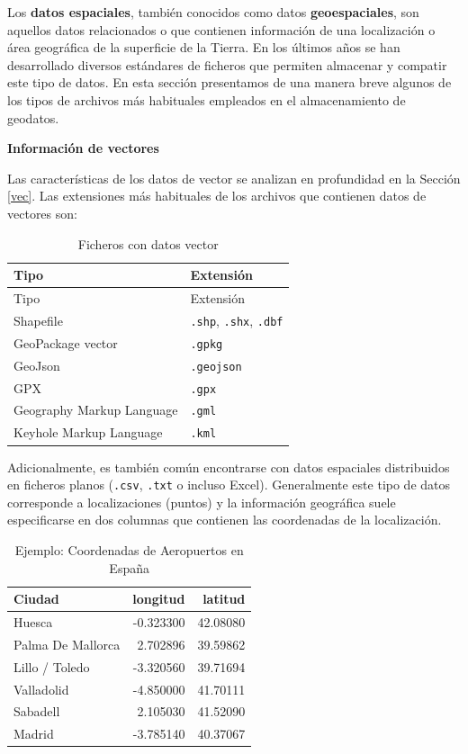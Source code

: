 \documentclass[
]{report}
\theoremstyle{definition}
\theoremstyle{definition}
\theoremstyle{definition}
\theoremstyle{definition}
\theoremstyle{remark}
\begin{document}
Los \textbf{datos espaciales}, también conocidos como datos \textbf{geoespaciales}, son
aquellos datos relacionados o que contienen información de una localización o
área geográfica de la superficie de la Tierra. En los últimos años se han
desarrollado diversos estándares de ficheros que permiten almacenar y compatir
este tipo de datos. En esta sección presentamos de una manera breve algunos de
los tipos de archivos más habituales empleados en el almacenamiento de geodatos.

\textbf{Información de vectores}

Las características de los datos de vector se analizan en profundidad en la
Sección \ref{vec}. Las extensiones más habituales de los archivos que contienen
datos de vectores son:

\begin{longtable}[]{@{}ll@{}}
\caption{Ficheros con datos vector}\tabularnewline
\toprule
Tipo & Extensión \\
\midrule
\endfirsthead
\toprule
Tipo & Extensión \\
\midrule
\endhead
Shapefile & \texttt{.shp}, \texttt{.shx}, \texttt{.dbf} \\
GeoPackage vector & \texttt{.gpkg} \\
GeoJson & \texttt{.geojson} \\
GPX & \texttt{.gpx} \\
Geography Markup Language & \texttt{.gml} \\
Keyhole Markup Language & \texttt{.kml} \\
\bottomrule
\end{longtable}

Adicionalmente, es también común encontrarse con datos espaciales distribuidos
en ficheros planos (\texttt{.csv}, \texttt{.txt} o incluso Excel). Generalmente este tipo de
datos corresponde a localizaciones (puntos) y la información geográfica suele
especificarse en dos columnas que contienen las coordenadas de la localización.

\begin{table}

\caption{\label{tab:unnamed-chunk-7}Ejemplo: Coordenadas de Aeropuertos en España}
\centering
\begin{tabular}[t]{l|r|r}
\hline
Ciudad & longitud & latitud\\
\hline
Huesca & -0.323300 & 42.08080\\
\hline
Palma De Mallorca & 2.702896 & 39.59862\\
\hline
Lillo / Toledo & -3.320560 & 39.71694\\
\hline
Valladolid & -4.850000 & 41.70111\\
\hline
Sabadell & 2.105030 & 41.52090\\
\hline
Madrid & -3.785140 & 40.37067\\
\hline
\end{tabular}
\end{table}
\end{document}
